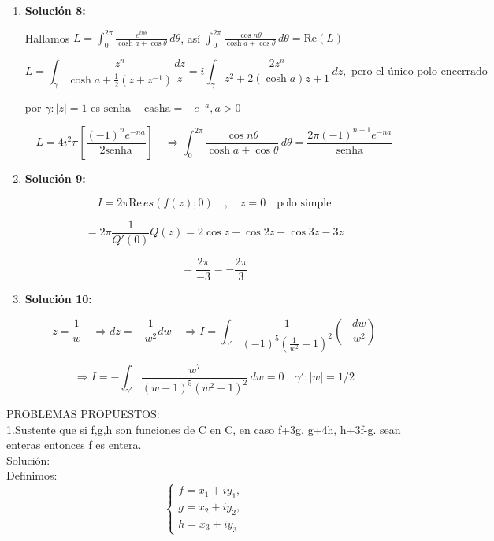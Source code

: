 \documentclass[a4paper,12pt]{article}
\begin{document}
\begin{enumerate}
\[
I = \frac{\pi}{2^{n-1}} \binom{2n}{n}
\]

\item \textbf{Solución 8:}

Hallamos \( L = \int_{0}^{2\pi} \frac{e^{in\theta}}{\cosh a + \cos \theta} \, d\theta \), así \( \int_{0}^{2\pi} \frac{\cos n\theta}{\cosh a + \cos \theta} \, d\theta = \text{Re}(L) \)

\[
L = \int_{\gamma} \frac{z^n}{\cosh a + \frac{1}{2} \left(z + z^{-1}\right)} \frac{dz}{z} = i \int_{\gamma} \frac{2z^n}{z^2 + 2(\cosh a)z + 1} \, dz, \text{ pero el único polo encerrado}
\]

por \(\gamma : |z| = 1\) es \(\text{senha} - \text{casha} = -e^{-a}, a > 0\)

\[
L = 4i^2 \pi \left[ \frac{(-1)^n e^{-na}}{2 \text{senha}} \right] \quad \Rightarrow \int_{0}^{2\pi} \frac{\cos n\theta}{\cosh a + \cos \theta} \, d\theta = \frac{2\pi (-1)^{n+1} e^{-na}}{\text{senha}}
\]

\item \textbf{Solución 9:}

\[
I = 2\pi \text{Re} \, es(f(z); 0) \quad , \quad z = 0 \quad \text{polo simple}
\]

\[
= 2\pi \frac{1}{Q'(0)} Q(z) = 2\cos z - \cos 2z - \cos 3z - 3z
\]

\[
= \frac{2\pi}{-3} = -\frac{2\pi}{3}
\]

\item \textbf{Solución 10:}

\[
z = \frac{1}{w} \quad \Rightarrow dz = -\frac{1}{w^2} dw \quad \Rightarrow I = \int_{\gamma'} \frac{1}{(-1)^5 \left(\frac{1}{w^2} + 1\right)^2} \left(-\frac{dw}{w^2}\right)
\]


\[
\Rightarrow I = - \int_{\gamma'} \frac{w^7}{(w-1)^5 (w^2 + 1)^2} \, dw = 0 \quad \gamma' : |w| = 1/2
\]
\end{enumerate}
\newpage

PROBLEMAS PROPUESTOS:\\

1.Sustente que si f,g,h son funciones de C en C, en caso f+3g. g+4h, h+3f-g. sean enteras entonces f es entera. \\
Solución:\\
Definimos:\\
\[
\begin{cases}
f = x_1 + i y_1, \\
g = x_2 + i y_2, \\
h = x_3 + i y_3
\end{cases}
\]
\end{document}
